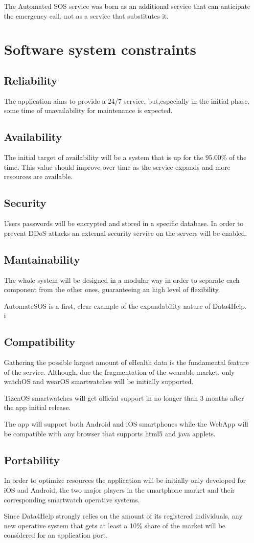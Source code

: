 The Automated SOS service was born as an additional service that can anticipate the emergency call, not as a service that substitutes it.


\section{Software system constraints}
\subsection{Reliability}
The application aims to provide a 24/7 service, but,especially in the initial phase, some time of unavailability for maintenance is expected.
\subsection{Availability}
The initial target of availability will be a system that is up for the 95.00\% of the time. This value should improve over time as the service expands and more resources are available.
\subsection{Security}
Users passwords will be encrypted and stored in a specific database.
In order to prevent DDoS attacks an external security service on the servers will be enabled.
\subsection{Mantainability}
The whole system will be designed in a modular way in order to separate each component from the other ones, guaranteeing an high level of flexibility. 

AutomateSOS is a first, clear example of the expandability nature of Data4Help.
i\subsection{Compatibility}
Gathering the possible largest amount of eHealth data is the fundamental feature of the service. Although, due the fragmentation of the wearable market, only watchOS and wearOS smartwatches will be initially supported. 

TizenOS smartwatches will get official support in no longer than 3 months after the app initial release.

The app will support both Android and iOS smartphones while the WebApp will be compatible with any browser that supports html5 and java applets.

\subsection{Portability}
In order to optimize resources the application will be initially only developed for iOS and Android, the two major players in the smartphone market and their corresponding smartwatch operative systems.

Since Data4Help strongly relies on the amount of its registered individuals, any new operative system that gets at least a 10\% share of the market will be considered for an application port.
